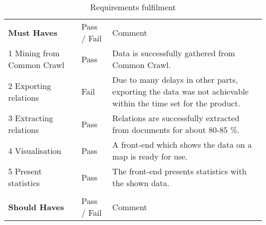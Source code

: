 \begin{table}[H]
\centering
\caption{Requirements fulfilment}
\label{requirements_pass/fail}
\begin{tabular}{ll m{8cm}}
\textbf{Must Haves}                     & Pass / Fail & Comment                                                                                                                                                                                                                               \\
1 Mining from Common Crawl     & Pass        & Data is successfully gathered from Common Crawl.                                                                                                                                                                                       \\
2 Exporting relations          & Fail        & Due to many delays in other parts, exporting the data was not achievable within the time set for the product.                                                                                                                         \\
3 Extracting relations         & Pass        & Relations are successfully extracted from documents for about 80-85 \%.                                                                                                                                                            \\
4 Visualisation                & Pass        & A front-end which shows the data on a map is ready for use.                                                                                                                                                                           \\
5 Present statistics           & Pass        & The front-end presents statistics with the shown data.                                                                                                                                                                                \\
                               &             &                                                                                                                                                                                                                                       \\
\textbf{Should Haves}                   & Pass / Fail & Comment                                                                                                                                                                                                                               \\

\end{tabular}
\end{table}
